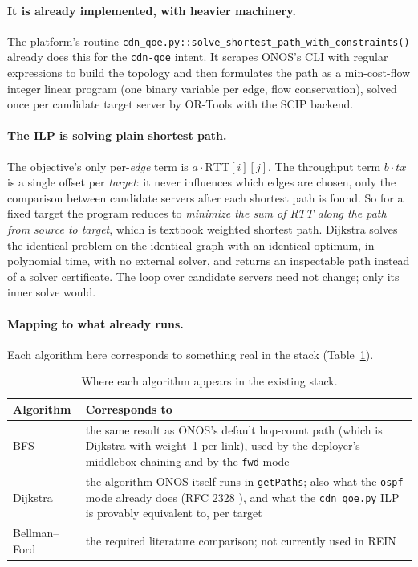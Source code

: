 \documentclass[11pt,a4paper]{article}
\begin{document}
\paragraph{It is already implemented, with heavier machinery.}
The platform's routine \texttt{cdn\_qoe.py::solve\_shortest\_path\_with\_constraints()} already does this for the
\texttt{cdn-qoe} intent. It scrapes ONOS's CLI with regular expressions to build the topology and then formulates the path as a
min-cost-flow integer linear program (one binary variable per edge, flow conservation), solved once per candidate target server by
OR-Tools with the SCIP backend.

\paragraph{The ILP is solving plain shortest path.}
The objective's only per-\emph{edge} term is $a\cdot\text{RTT}[i][j]$. The throughput term $b\cdot tx$ is a single offset per
\emph{target}: it never influences which edges are chosen, only the comparison between candidate servers after each shortest path is
found. So for a fixed target the program reduces to
\emph{minimize the sum of RTT along the path from source to target}, which is textbook weighted shortest path.
Dijkstra solves the identical problem on the identical graph with an identical optimum, in polynomial time, with no external
solver, and returns an inspectable path instead of a solver certificate. The loop over candidate servers need not change;
only its inner solve would.

\paragraph{Mapping to what already runs.}
Each algorithm here corresponds to something real in the stack (Table~\ref{tab:mapping}).

\begin{table}[htbp]
\centering
\begin{tabular}{lp{9.5cm}}
\toprule
Algorithm & Corresponds to \\
\midrule
BFS & the same result as ONOS's default hop-count path (which is Dijkstra with weight~1 per link), used by the deployer's middlebox chaining and by the \texttt{fwd} mode \\
Dijkstra & the algorithm ONOS itself runs in \texttt{getPaths}; also what the \texttt{ospf} mode already does (RFC 2328 \cite{rfc2328}), and what the \texttt{cdn\_qoe.py} ILP is provably equivalent to, per target \\
Bellman--Ford & the required literature comparison; not currently used in REIN \\
\bottomrule
\end{tabular}
\caption{Where each algorithm appears in the existing stack.}
\label{tab:mapping}
\end{table}
\end{document}
